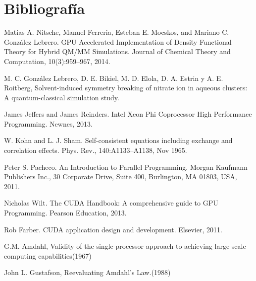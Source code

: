 \documentclass[a4paper, 12pt]{article}
\begin{document}
\section*{Bibliograf\'ia}

\begin{thebibliography}{9}

Matias A. Nitsche, Manuel Ferreria, Esteban E. Mocskos, and Mariano C.
Gonz\'alez Lebrero. GPU Accelerated Implementation of Density Functional Theory
for Hybrid QM/MM Simulations. Journal of Chemical Theory and Computation,
10(3):959–967, 2014.

 M. C. Gonz\'alez Lebrero, D. E. Bikiel, M. D. Elola, D. A. Estrin y A. E. Roitberg,
Solvent-induced symmetry breaking of nitrate ion in aqueous clusters: A quantum-classical simulation study.

 James Jeffers and James Reinders. Intel Xeon Phi Coprocessor High Performance
Programming. Newnes, 2013.

W. Kohn and L. J. Sham. Self-consistent equations including exchange and correlation
effects. Phys. Rev., 140:A1133–A1138, Nov 1965.

Peter S. Pacheco. An Introduction to Parallel Programming. Morgan Kaufmann
Publishers Inc., 30 Corporate Drive, Suite 400, Burlington, MA 01803, USA, 2011.

 Nicholas Wilt. The CUDA Handbook: A comprehensive guide to GPU Programming.
Pearson Education, 2013.

 Rob Farber. CUDA application design and development. Elsevier, 2011.

 G.M. Amdahl, Validity of the single-processor approach to achieving large scale computing capabilities(1967)

John L. Gustafson, Reevaluating Amdahl's Law.(1988)

\end{thebibliography}
\end{document}
